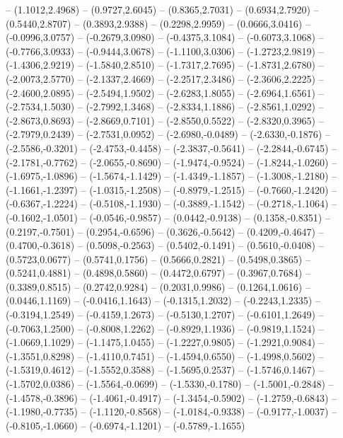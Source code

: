 {	-- (1.1012,2.4968)
	-- (0.9727,2.6045)
	-- (0.8365,2.7031)
	-- (0.6934,2.7920)
	-- (0.5440,2.8707)
	-- (0.3893,2.9388)
	-- (0.2298,2.9959)
	-- (0.0666,3.0416)
	-- (-0.0996,3.0757)
	-- (-0.2679,3.0980)
	-- (-0.4375,3.1084)
	-- (-0.6073,3.1068)
	-- (-0.7766,3.0933)
	-- (-0.9444,3.0678)
	-- (-1.1100,3.0306)
	-- (-1.2723,2.9819)
	-- (-1.4306,2.9219)
	-- (-1.5840,2.8510)
	-- (-1.7317,2.7695)
	-- (-1.8731,2.6780)
	-- (-2.0073,2.5770)
	-- (-2.1337,2.4669)
	-- (-2.2517,2.3486)
	-- (-2.3606,2.2225)
	-- (-2.4600,2.0895)
	-- (-2.5494,1.9502)
	-- (-2.6283,1.8055)
	-- (-2.6964,1.6561)
	-- (-2.7534,1.5030)
	-- (-2.7992,1.3468)
	-- (-2.8334,1.1886)
	-- (-2.8561,1.0292)
	-- (-2.8673,0.8693)
	-- (-2.8669,0.7101)
	-- (-2.8550,0.5522)
	-- (-2.8320,0.3965)
	-- (-2.7979,0.2439)
	-- (-2.7531,0.0952)
	-- (-2.6980,-0.0489)
	-- (-2.6330,-0.1876)
	-- (-2.5586,-0.3201)
	-- (-2.4753,-0.4458)
	-- (-2.3837,-0.5641)
	-- (-2.2844,-0.6745)
	-- (-2.1781,-0.7762)
	-- (-2.0655,-0.8690)
	-- (-1.9474,-0.9524)
	-- (-1.8244,-1.0260)
	-- (-1.6975,-1.0896)
	-- (-1.5674,-1.1429)
	-- (-1.4349,-1.1857)
	-- (-1.3008,-1.2180)
	-- (-1.1661,-1.2397)
	-- (-1.0315,-1.2508)
	-- (-0.8979,-1.2515)
	-- (-0.7660,-1.2420)
	-- (-0.6367,-1.2224)
	-- (-0.5108,-1.1930)
	-- (-0.3889,-1.1542)
	-- (-0.2718,-1.1064)
	-- (-0.1602,-1.0501)
	-- (-0.0546,-0.9857)
	-- (0.0442,-0.9138)
	-- (0.1358,-0.8351)
	-- (0.2197,-0.7501)
	-- (0.2954,-0.6596)
	-- (0.3626,-0.5642)
	-- (0.4209,-0.4647)
	-- (0.4700,-0.3618)
	-- (0.5098,-0.2563)
	-- (0.5402,-0.1491)
	-- (0.5610,-0.0408)
	-- (0.5723,0.0677)
	-- (0.5741,0.1756)
	-- (0.5666,0.2821)
	-- (0.5498,0.3865)
	-- (0.5241,0.4881)
	-- (0.4898,0.5860)
	-- (0.4472,0.6797)
	-- (0.3967,0.7684)
	-- (0.3389,0.8515)
	-- (0.2742,0.9284)
	-- (0.2031,0.9986)
	-- (0.1264,1.0616)
	-- (0.0446,1.1169)
	-- (-0.0416,1.1643)
	-- (-0.1315,1.2032)
	-- (-0.2243,1.2335)
	-- (-0.3194,1.2549)
	-- (-0.4159,1.2673)
	-- (-0.5130,1.2707)
	-- (-0.6101,1.2649)
	-- (-0.7063,1.2500)
	-- (-0.8008,1.2262)
	-- (-0.8929,1.1936)
	-- (-0.9819,1.1524)
	-- (-1.0669,1.1029)
	-- (-1.1475,1.0455)
	-- (-1.2227,0.9805)
	-- (-1.2921,0.9084)
	-- (-1.3551,0.8298)
	-- (-1.4110,0.7451)
	-- (-1.4594,0.6550)
	-- (-1.4998,0.5602)
	-- (-1.5319,0.4612)
	-- (-1.5552,0.3588)
	-- (-1.5695,0.2537)
	-- (-1.5746,0.1467)
	-- (-1.5702,0.0386)
	-- (-1.5564,-0.0699)
	-- (-1.5330,-0.1780)
	-- (-1.5001,-0.2848)
	-- (-1.4578,-0.3896)
	-- (-1.4061,-0.4917)
	-- (-1.3454,-0.5902)
	-- (-1.2759,-0.6843)
	-- (-1.1980,-0.7735)
	-- (-1.1120,-0.8568)
	-- (-1.0184,-0.9338)
	-- (-0.9177,-1.0037)
	-- (-0.8105,-1.0660)
	-- (-0.6974,-1.1201)
	-- (-0.5789,-1.1655)
}
